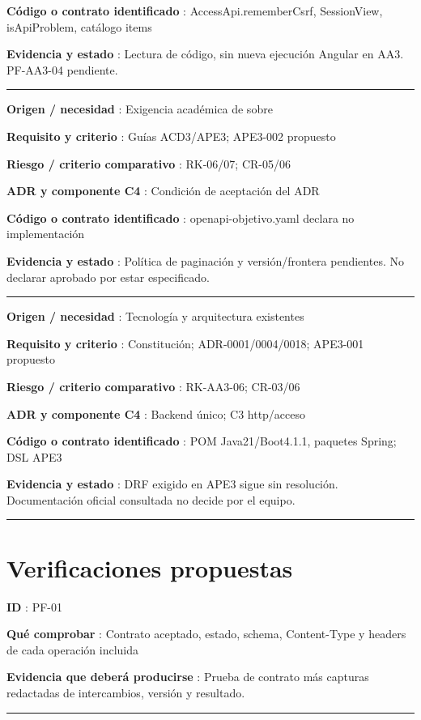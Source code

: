 \documentclass[12pt,a4paper]{report}
\begin{document}
\textbf{Código o contrato identificado }: AccessApi.rememberCsrf,
SessionView, isApiProblem, catálogo items

\textbf{Evidencia y estado }: Lectura de código, sin nueva ejecución
Angular en AA3. PF-AA3-04 pendiente.

\medskip\hrule\medskip

\textbf{Origen / necesidad }: Exigencia académica de sobre

\textbf{Requisito y criterio }: Guías ACD3/APE3; APE3-002 propuesto

\textbf{Riesgo / criterio comparativo }: RK-06/07; CR-05/06

\textbf{ADR y componente C4 }: Condición de aceptación del ADR

\textbf{Código o contrato identificado }: openapi-objetivo.yaml declara
no implementación

\textbf{Evidencia y estado }: Política de paginación y versión/frontera
pendientes. No declarar aprobado por estar especificado.

\medskip\hrule\medskip

\textbf{Origen / necesidad }: Tecnología y arquitectura existentes

\textbf{Requisito y criterio }: Constitución; ADR-0001/0004/0018;
APE3-001 propuesto

\textbf{Riesgo / criterio comparativo }: RK-AA3-06; CR-03/06

\textbf{ADR y componente C4 }: Backend único; C3 http/acceso

\textbf{Código o contrato identificado }: POM Java21/Boot4.1.1, paquetes
Spring; DSL APE3

\textbf{Evidencia y estado }: DRF exigido en APE3 sigue sin resolución.
Documentación oficial consultada no decide por el equipo.

\medskip\hrule\medskip

\section{Verificaciones
propuestas}\label{traza-verificaciones-propuestas}

\textbf{ID }: PF-01

\textbf{Qué comprobar }: Contrato aceptado, estado, schema, Content-Type
y headers de cada operación incluida

\textbf{Evidencia que deberá producirse }: Prueba de contrato más
capturas redactadas de intercambios, versión y resultado.

\medskip\hrule\medskip
\end{document}
